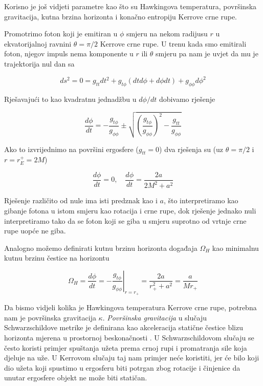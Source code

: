 Korisno je još vidjeti parametre kao što su Hawkingova temperatura, površinska gravitacija, kutna brzina horizonta i konačno entropiju Kerrove crne rupe.

Promotrimo foton koji je emitiran u $\phi$ smjeru na nekom radijusu $r$ u ekvatorijalnoj ravnini $\theta=\pi/2$ Kerrove crne rupe. U trenu kada smo emitirali foton, njegov impuls nema komponente u $r$ ili $\theta$ smjeru pa nam je uvjet da mu je trajektorija nul dan sa

\begin{equation}
ds^2=0=g_{tt}dt^2+g_{t\phi}(dt d\phi+d\phi dt)+g_{\phi\phi}d\phi^2
\end{equation}

\noindent Rješavajući to kao kvadratnu jednadžbu u $d\phi/dt$ dobivamo rješenje

\begin{equation}
\frac{d\phi}{dt}=-\frac{g_{t\phi}}{g_{\phi\phi}}\pm\sqrt{\left(\frac{g_{t\phi}}{g_{\phi\phi}}\right)^2-\frac{g_{tt}}{g_{\phi\phi}}}
\end{equation}

\noindent Ako to izvrijednimo na površini ergosfere ($g_{tt}=0$) dva rješenja su (uz $\theta=\pi/2$ i $r=r^+_E=2M$)

\begin{equation}
\frac{d\phi}{dt}=0,\quad \frac{d\phi}{dt}=\frac{2a}{2M^2+a^2}
\end{equation}

\noindent Rješenje različito od nule ima isti predznak kao i $a$, što interpretiramo kao gibanje fotona u istom smjeru kao rotacija i crne rupe, dok rješenje jednako nuli interpretiramo tako da se foton koji se giba u smjeru suprotno od vrtnje crne rupe uopće ne giba.

Analogno možemo definirati kutnu brzinu horizonta događaja $\Omega_H$ kao minimalnu kutnu brzinu čestice na horizontu

\begin{equation}
\Omega_H=\frac{d\phi}{dt}=-\left.\frac{g_{t\phi}}{g_{\phi\phi}}\right\rvert_{r=r_+}=\frac{2a}{r^2_+ +a^2}=\frac{a}{Mr_+}
\end{equation}

Da bismo vidjeli kolika je Hawkingova temperatura Kerrove crne rupe, potrebna nam je površinska gravitacija $\kappa$.
\emph{Površinska gravitacija} u slučaju Schwarzschildove metrike je definirana kao akceleracija statične čestice blizu horizonta mjerena u prostornoj beskonačnosti \citep{Townsend:1997ku}. U Schwarzschildovom slučaju se često koristi primjer spuštanja užeta prema crnoj rupi i promatranja sile koja djeluje na uže. U Kerrovom slučaju taj nam primjer neće koristiti, jer će bilo koji dio užeta koji spustimo u ergosferu biti potrgan zbog rotacije i činjenice da unutar ergosfere objekt ne može biti statičan.

